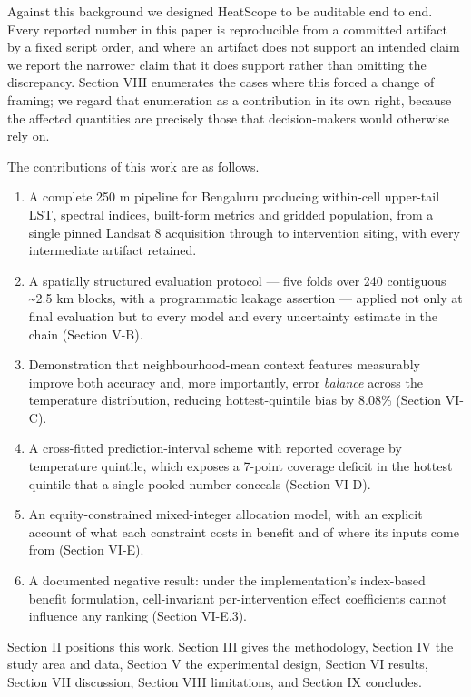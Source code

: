 \documentclass[conference]{IEEEtran}
\providecommand{\tightlist}{\setlength{\itemsep}{0pt}\setlength{\parskip}{0pt}}
\begin{document}
Against this background we designed HeatScope to be auditable end to end. Every reported number in
this paper is reproducible from a committed artifact by a fixed script order, and where an artifact
does not support an intended claim we report the narrower claim that it does support rather than
omitting the discrepancy. Section VIII enumerates the cases where this forced a change of framing;
we regard that enumeration as a contribution in its own right, because the affected quantities are
precisely those that decision-makers would otherwise rely on.

The contributions of this work are as follows.

\begin{enumerate}
\def\labelenumi{\arabic{enumi}.}
\tightlist
\item
  A complete 250 m pipeline for Bengaluru producing within-cell upper-tail LST, spectral indices,
  built-form metrics and gridded population, from a single pinned Landsat 8 acquisition through to
  intervention siting, with every intermediate artifact retained.
\item
  A spatially structured evaluation protocol --- five folds over 240 contiguous \textasciitilde2.5 km blocks, with
  a programmatic leakage assertion --- applied not only at final evaluation but to every model and
  every uncertainty estimate in the chain (Section V-B).
\item
  Demonstration that neighbourhood-mean context features measurably improve both accuracy and, more
  importantly, error \emph{balance} across the temperature distribution, reducing hottest-quintile bias
  by 8.08\% (Section VI-C).
\item
  A cross-fitted prediction-interval scheme with reported coverage by temperature quintile, which
  exposes a 7-point coverage deficit in the hottest quintile that a single pooled number conceals
  (Section VI-D).
\item
  An equity-constrained mixed-integer allocation model, with an explicit account of what each
  constraint costs in benefit and of where its inputs come from (Section VI-E).
\item
  A documented negative result: under the implementation's index-based benefit formulation,
  cell-invariant per-intervention effect coefficients cannot influence any ranking (Section VI-E.3).
\end{enumerate}

Section II positions this work. Section III gives the methodology, Section IV the study area and
data, Section V the experimental design, Section VI results, Section VII discussion, Section VIII
limitations, and Section IX concludes.
\end{document}
